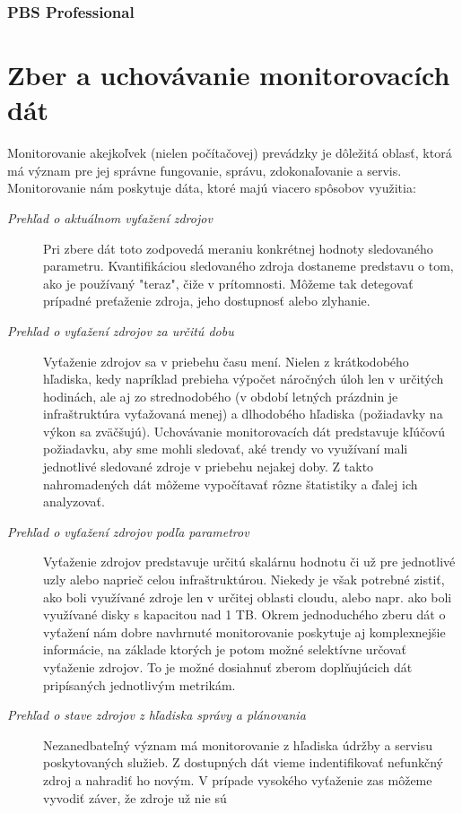 \documentclass[printed,11pt,twoside,color,cover,table]{fithesis3}
\begin{document}
\subsection{PBS Professional}

\chapter{Zber a uchovávanie monitorovacích dát}
Monitorovanie akejkoľvek (nielen počítačovej) prevádzky je dôležitá oblasť, ktorá má význam pre jej správne fungovanie, správu, zdokonaľovanie a servis. Monitorovanie nám poskytuje dáta, ktoré majú viacero 
spôsobov využitia:
\begin{description}
\item[\emph{Prehľad o aktuálnom vyťažení zdrojov}]
Pri zbere dát toto zodpovedá meraniu konkrétnej hodnoty sledovaného parametru. Kvantifikáciou sledovaného zdroja dostaneme predstavu o tom, ako je používaný "teraz", čiže v prítomnosti. Môžeme tak detegovať prípadné
preťaženie zdroja, jeho dostupnosť alebo zlyhanie.
\item[\emph{Prehľad o vyťažení zdrojov za určitú dobu}]
Vyťaženie zdrojov sa v priebehu času mení. Nielen z krátkodobého hľadiska, kedy napríklad prebieha výpočet náročných úloh len v určitých hodinách, ale aj zo strednodobého (v období letných prázdnin je infraštruktúra 
vyťažovaná menej) a dlhodobého hľadiska (požiadavky na výkon sa zväčšujú). Uchovávanie monitorovacích dát predstavuje kľúčovú požiadavku, aby sme mohli sledovať, aké trendy vo využívaní mali jednotlivé sledované zdroje v priebehu nejakej doby.
Z takto nahromadených dát môžeme vypočítavať rôzne štatistiky a ďalej ich analyzovať.
\item[\emph{Prehľad o vyťažení zdrojov podľa parametrov}]
Vyťaženie zdrojov predstavuje určitú skalárnu hodnotu či už pre jednotlivé uzly alebo naprieč celou infraštruktúrou. Niekedy je však potrebné zistiť, ako boli využívané zdroje len v určitej oblasti cloudu,
alebo napr. ako boli využívané disky s kapacitou nad 1 TB. Okrem jednoduchého zberu dát o vyťažení nám dobre navhrnuté monitorovanie poskytuje aj komplexnejšie informácie, na základe ktorých je potom možné
selektívne určovať vyťaženie zdrojov. To je možné dosiahnuť zberom doplňujúcich dát pripísaných jednotlivým metrikám.
\item[\emph{Prehľad o stave zdrojov z hľadiska správy a plánovania}]
Nezanedbateľný význam má monitorovanie z hľadiska údržby a servisu poskytovaných služieb. Z dostupných dát vieme indentifikovať nefunkčný zdroj a nahradiť ho novým. V prípade vysokého vyťaženie zas môžeme vyvodiť záver, že zdroje už nie sú

\end{description}
\end{document}
